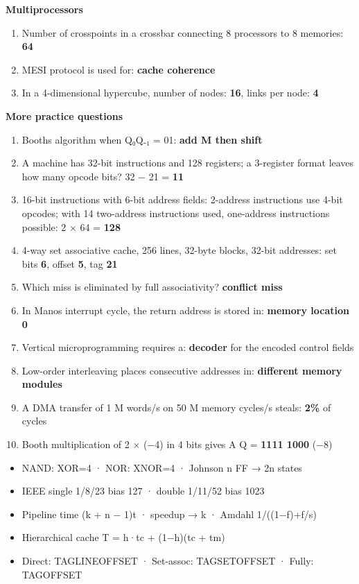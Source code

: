 \textbf{Multiprocessors}

\begin{enumerate}
\def\labelenumi{\arabic{enumi}.}
\setcounter{enumi}{37}
\tightlist
\item
  Number of crosspoints in a crossbar connecting 8 processors to 8 memories: \textbf{64}
\item
  MESI protocol is used for: \textbf{cache coherence}
\item
  In a 4-dimensional hypercube, number of nodes: \textbf{16}, links per node: \textbf{4}
\end{enumerate}

\textbf{More practice questions}

\begin{enumerate}
\def\labelenumi{\arabic{enumi}.}
\setcounter{enumi}{40}
\tightlist
\item
  Booth\textquotesingle s algorithm when Q₀Q₋₁ = 01: \textbf{add M then shift}
\item
  A machine has 32-bit instructions and 128 registers; a 3-register format leaves how many opcode bits? 32 − 21 = \textbf{11}
\item
  16-bit instructions with 6-bit address fields: 2-address instructions use 4-bit opcodes; with 14 two-address instructions used, one-address instructions possible: 2 × 64 = \textbf{128}
\item
  4-way set associative cache, 256 lines, 32-byte blocks, 32-bit addresses: set bits \textbf{6}, offset \textbf{5}, tag \textbf{21}
\item
  Which miss is eliminated by full associativity? \textbf{conflict miss}
\item
  In Mano\textquotesingle s interrupt cycle, the return address is stored in: \textbf{memory location 0}
\item
  Vertical microprogramming requires a: \textbf{decoder} for the encoded control fields
\item
  Low-order interleaving places consecutive addresses in: \textbf{different memory modules}
\item
  A DMA transfer of 1 M words/s on 50 M memory cycles/s steals: \textbf{2\%} of cycles
\item
  Booth multiplication of 2 × (−4) in 4 bits gives A Q = \textbf{1111 1000} (−8)
\end{enumerate}

\begin{revbox}

\begin{itemize}
\tightlist
\item
  NAND: XOR=4 · NOR: XNOR=4 · Johnson n FF → 2n states
\item
  IEEE single 1/8/23 bias 127 · double 1/11/52 bias 1023
\item
  Pipeline time (k + n − 1)t · speedup → k · Amdahl 1/((1−f)+f/s)
\item
  Hierarchical cache T = h·tc + (1−h)(tc + tm)
\item
  Direct: TAG\textbar LINE\textbar OFFSET · Set-assoc: TAG\textbar SET\textbar OFFSET · Fully: TAG\textbar OFFSET
\end{itemize}

\end{revbox}
